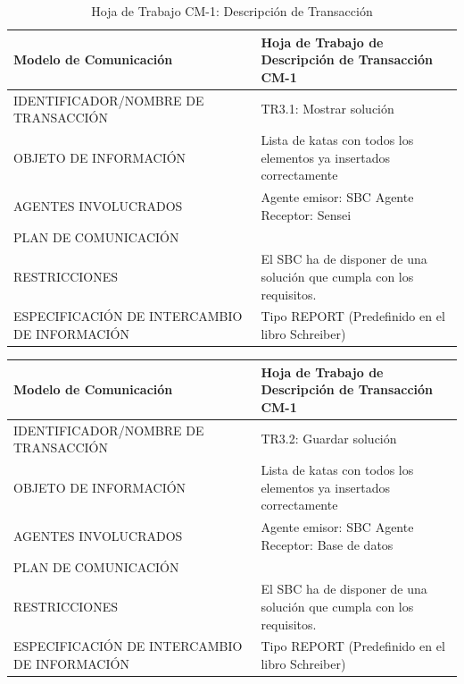 \documentclass[12pt,a4paper,twoside,spanish]{article}      %
\begin{document}
\begin{table}[H]
\centering
\caption{Hoja de Trabajo CM-1: Descripción de Transacción}
\label{tab:cm1}
 
\begin{tabularx}{\textwidth}{|X|>{\raggedright\arraybackslash}X|}
\hline
\textbf{Modelo de Comunicación} & \textbf{Hoja de Trabajo de Descripción de Transacción CM-1} \\
\hline
 
IDENTIFICADOR/NOMBRE DE TRANSACCIÓN & TR3.1: Mostrar solución \\
\hline
 
OBJETO DE INFORMACIÓN & Lista de katas con todos los elementos ya insertados correctamente
\\
\hline
 
AGENTES INVOLUCRADOS & Agente emisor: SBC \newline Agente Receptor: Sensei
  \\ 
\hline
 
PLAN DE COMUNICACIÓN & 
\\
\hline
 
RESTRICCIONES & El SBC ha de disponer de una solución que cumpla con los requisitos. 
\\
\hline
 
ESPECIFICACIÓN DE INTERCAMBIO DE INFORMACIÓN & Tipo REPORT (Predefinido en el libro Schreiber)
\\
\hline
 
\end{tabularx}
 
\end{table}


\begin{table}[H]
\centering
\label{tab:cm1}
 
\begin{tabularx}{\textwidth}{|X|X|}
\hline
\textbf{Modelo de Comunicación} & \textbf{Hoja de Trabajo de Descripción de Transacción CM-1} \\
\hline
 
IDENTIFICADOR/NOMBRE DE TRANSACCIÓN & TR3.2: Guardar solución \\
\hline
 
OBJETO DE INFORMACIÓN & Lista de katas con todos los elementos ya insertados correctamente
\\
\hline
 
  AGENTES INVOLUCRADOS & Agente emisor: SBC \newline Agente Receptor: Base de datos
  \\ 
\hline
 
PLAN DE COMUNICACIÓN & 
\\
\hline
 
RESTRICCIONES & El SBC ha de disponer de una solución que cumpla con los requisitos. 
\\
\hline
 
ESPECIFICACIÓN DE INTERCAMBIO DE INFORMACIÓN & Tipo REPORT (Predefinido en el libro Schreiber)
\\
\hline
 
\end{tabularx}
 
\end{table}
\end{document}
